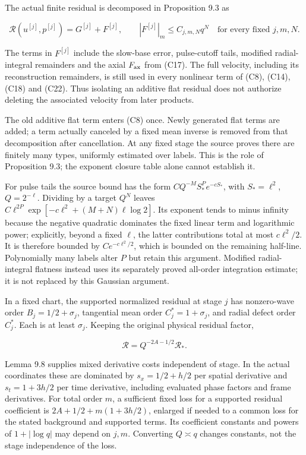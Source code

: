\documentclass[10pt,a4paper]{article}
\begin{document}
The actual finite residual is decomposed in Proposition 9.3 as

\[
\mathcal R(u^{[j]},p^{[j]})=G^{[j]}+F^{[j]},\qquad
|F^{[j]}|_m\le C_{j,m,N}q^N\quad\text{for every fixed }j,m,N.
\tag{C29}
\]

The terms in \(F^{[j]}\) include the slow-base error, pulse-cutoff tails, modified radial-integral remainders and the axial \(F_{\rm ax}\) from (C17). The full velocity, including its reconstruction remainders, is still used in every nonlinear term of (C8), (C14), (C18) and (C22). Thus isolating an additive flat residual does not authorize deleting the associated velocity from later products.

The old additive flat term enters (C8) once. Newly generated flat terms are added; a term actually canceled by a fixed mean inverse is removed from that decomposition after cancellation. At any fixed stage the source proves there are finitely many types, uniformly estimated over labels. This is the role of Proposition 9.3; the exponent closure table alone cannot establish it.

For pulse tails the source bound has the form \(CQ^{-M}S_*^Pe^{-cS_*}\), with \(S_*=\ell^2\), \(Q=2^{-\ell}\). Dividing by a target \(Q^N\) leaves \(C\ell^{2P}\exp[-c\ell^2+(M+N)\ell\log2]\). Its exponent tends to minus infinity because the negative quadratic dominates the fixed linear term and logarithmic power; explicitly, beyond a fixed \(\ell\), the latter contributions total at most \(c\ell^2/2\). It is therefore bounded by \(Ce^{-c\ell^2/2}\), which is bounded on the remaining half-line. Polynomially many labels alter \(P\) but retain this argument. Modified radial-integral flatness instead uses its separately proved all-order integration estimate; it is not replaced by this Gaussian argument.

In a fixed chart, the supported normalized residual at stage \(j\) has nonzero-wave order \(B_j=1/2+\sigma_j\), tangential mean order \(C_j^*=1+\sigma_j\), and radial defect order \(C_j^*\). Each is at least \(\sigma_j\). Keeping the original physical residual factor,

\[
\mathcal R=Q^{-2A-1/2}\mathcal R_*.
\tag{C30}
\]

Lemma 9.8 supplies mixed derivative costs independent of stage. In the actual coordinates these are dominated by \(s_x=1/2+h/2\) per spatial derivative and \(s_t=1+3h/2\) per time derivative, including evaluated phase factors and frame derivatives. For total order \(m\), a sufficient fixed loss for a supported residual coefficient is \(2A+1/2+m(1+3h/2)\), enlarged if needed to a common loss for the stated background and supported terms. Its coefficient constants and powers of \(1+|\log q|\) may depend on \(j,m\). Converting \(Q\asymp q\) changes constants, not the stage independence of the loss.
\end{document}

